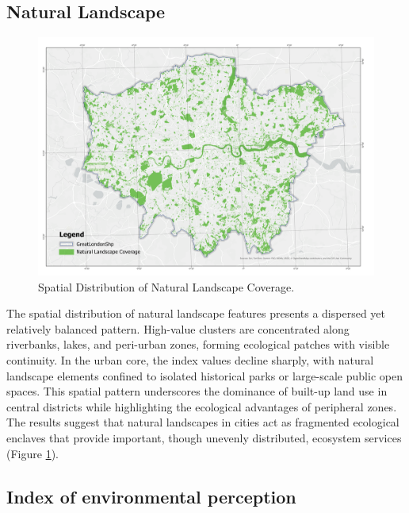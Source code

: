 \documentclass[
  12pt,
  oneside]{book}
\begin{document}
\subsection{Natural Landscape}\label{natural-landscape}

\begin{figure}

{\centering \includegraphics[width=1\linewidth]{general_images/nf} 

}

\caption{Spatial Distribution of Natural Landscape Coverage.}\label{fig:nf}
\end{figure}

The spatial distribution of natural landscape features presents a dispersed yet relatively balanced pattern. High-value clusters are concentrated along riverbanks, lakes, and peri-urban zones, forming ecological patches with visible continuity. In the urban core, the index values decline sharply, with natural landscape elements confined to isolated historical parks or large-scale public open spaces. This spatial pattern underscores the dominance of built-up land use in central districts while highlighting the ecological advantages of peripheral zones. The results suggest that natural landscapes in cities act as fragmented ecological enclaves that provide important, though unevenly distributed, ecosystem services (Figure \ref{fig:nf}).

\subsection{Index of environmental perception}\label{index-of-environmental-perception}
\end{document}
